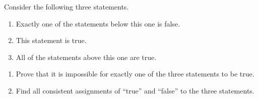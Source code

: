 Consider the following three statements.
\begin{enumerate}
\item Exactly one of the statements below this one is false.
\item This statement is true.
\item All of the statements above this one are true.
\end{enumerate}
\begin{enumerate}
\item[(a)] Prove that it is impossible for exactly one of the three statements to be true.
\item[(b)] Find all consistent assignments of ``true'' and ``false'' to the three statements.
\end{enumerate}
